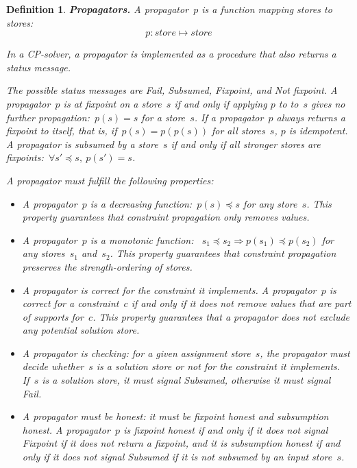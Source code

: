 \documentclass[a4paper,11pt]{article}
\newtheorem{definition}{Definition}
\numberwithin{equation}{section}
\begin{document}
\begin{definition} \label{def:prop}
  \textbf{Propagators.} A \emph{propagator}~$p$ is a function mapping stores to stores:
  \begin{equation*}
    p: store \mapsto store
  \end{equation*}

  In a CP-solver, a propagator is implemented as a procedure that also returns 
  a \emph{status message}.
  
  The possible status messages are \emph{Fail}, \emph{Subsumed},
  \emph{Fixpoint}, and \emph{Not fixpoint}. 
  A propagator~$p$ is at \emph{fixpoint} on a store~$s$ if and only if applying 
  $p$ to to~$s$ gives no further propagation:~$p(s) = s$ for
  a store~$s$. If a propagator~$p$ always returns a fixpoint to itself, that is, 
  if~$p(s) = p(p(s))$ for all stores~$s$, $p$ is \emph{idempotent}.
  A propagator is \emph{subsumed} by a store~$s$ if and only if
  all stronger stores are fixpoints:~$\forall s'\preceq s, \ p(s')=s$.

  A propagator must fulfill the following properties:

  \begin{itemize}
  \item A propagator~$p$ is a decreasing function:~$p(s) \preceq s$ for any store~$s$.
    This property guarantees that constraint propagation only removes values.

  \item A propagator~$p$ is a monotonic function:
    ~$s_1 \preceq s_2 \Rightarrow p(s_1) \preceq p(s_2)$
    for any stores~$s_1$ and~$s_2$. This property guarantees that constraint propagation
    preserves the strength-ordering of stores.

  \item A propagator is correct for the constraint it implements.
    A propagator~$p$
    is correct for a constraint~$c$ if and only if it does not
    remove values that are part of supports for~$c$.
    This property guarantees that a propagator does not exclude any potential 
    solution store.

  \item A propagator is \emph{checking}: for a given assignment store~$s$, the propagator
    must decide whether~$s$ is a solution store or not for the constraint it
    implements. If~$s$ is a solution store, it must signal Subsumed, otherwise
    it must signal Fail.

  \item A propagator must be \emph{honest}: it must be 
    \emph{fixpoint honest} and \emph{subsumption honest}. 
    A propagator~$p$ is fixpoint honest if and only if it does not signal 
    Fixpoint if it does not return a fixpoint, and it is subsumption honest
    if and only if it does
    not signal Subsumed if it is not subsumed by an input store~$s$.
    
\end{itemize}

\end{definition}
\end{document}

